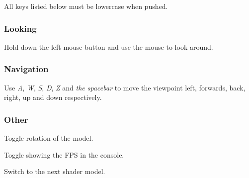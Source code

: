    All keys listed below must be lowercase when pushed.
    
    \subsubsection{Looking}
      
      Hold down the left mouse button and use the mouse to look around.

    \subsubsection{Navigation}

      Use \emph{A}, \emph{W}, \emph{S}, \emph{D}, \emph{Z} and \emph{the
      spacebar} to move the viewpoint left, forwards, back, right, up and down
      respectively.

    \subsubsection{Other}
      \begin{description}
        \setlength{\topsep}{0pt}
        \setlength{\parskip}{0pt}
        \setlength{\partopsep}{0pt}
        \setlength{\parsep}{0pt}
        \setlength{\itemsep}{0pt}

        \item[Q]{ Toggle rotation of the model. }

        \item[E]{ Toggle showing the FPS in the console. }

        \item[R]{ Switch to the next shader model. }

      \end{description}
